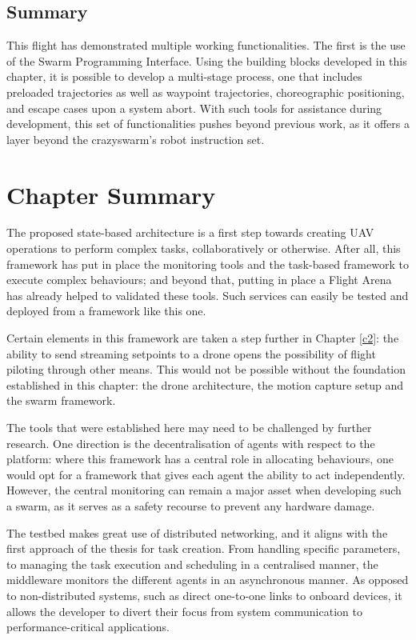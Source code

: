 \subsection{Summary}

This flight has demonstrated multiple working functionalities. The first is the use of the Swarm Programming Interface. Using the building blocks developed in this chapter, it is possible to develop a multi-stage process, one that includes preloaded trajectories as well as waypoint trajectories, choreographic positioning, and escape cases upon a system abort. With such tools for assistance during development, this set of functionalities pushes beyond previous work, as it offers a layer beyond the crazyswarm's robot instruction set.

\pagebreak
\section{Chapter Summary}


The proposed state-based architecture is a first step towards creating UAV operations to perform complex tasks, collaboratively or otherwise.  After all, this framework has put in place the monitoring tools and the task-based framework to execute complex behaviours; and beyond that, putting in place a Flight Arena has already helped to validated these tools. Such services can easily be tested and deployed from a framework like this one.

Certain elements in this framework are taken a step further in Chapter \ref{c2}: the ability to send streaming setpoints to a drone opens the possibility of flight piloting through other means. This would not be possible without the foundation established in this chapter: the drone architecture, the motion capture setup and the swarm framework.

The tools that were established here may need to be challenged by further research. One direction is the decentralisation of agents with respect to the platform: where this framework has a central role in allocating behaviours, one would opt for a framework that gives each agent the ability to act independently. However, the central monitoring can remain a major asset when developing such a swarm, as it serves as a safety recourse to prevent any hardware damage.

The testbed makes great use of distributed networking, and it aligns with the first approach of the thesis for task creation. From handling specific parameters, to managing the task execution and scheduling in a centralised manner, the middleware monitors the different agents in an asynchronous manner. As opposed to non-distributed systems, such as direct one-to-one links to onboard devices,  it allows the developer to divert their focus from system communication to performance-critical applications. 
